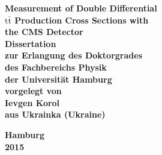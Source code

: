 \begin{titlepage}

\begin{center}

{ \huge \bfseries Measurement of Double Differential}\\[0.4cm]
{ \huge \bfseries $\text{t}\bar{\text{t}}$ Production Cross Sections with}\\[0.4cm]
{ \huge \bfseries the CMS Detector}\\[5.0cm]

{\LARGE \bfseries Dissertation}\\[0.4cm]
{\LARGE \bfseries zur Erlangung des Doktorgrades}\\[0.4cm]
{\LARGE \bfseries des Fachbereichs Physik}\\[0.4cm]
{\LARGE \bfseries der Universit\"at Hamburg}\\[5.0cm]

{\Large \bfseries vorgelegt von}\\[0.4cm]
{\Large \bfseries Ievgen Korol}\\[0.4cm]
{\Large \bfseries aus Ukrainka (Ukraine)}

\vfill

{\Large \bfseries Hamburg}\\[0.4cm]
{\Large \bfseries 2015}\\[0.4cm]

\end{center}

\end{titlepage}